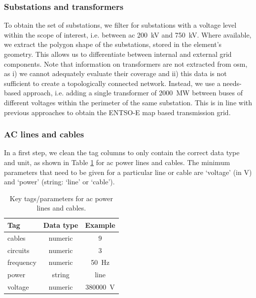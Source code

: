 \documentclass[fleqn,10pt]{wlscirep}
\let\autocite\cite
\begin{document}
\subsubsection*{Substations and transformers}
To obtain the set of substations, we filter for substations with a voltage level within the scope of interest, i.e. between \acrshort{ac} \SI{200}{\kilo\volt} and \SI{750}{\kilo\volt}. Where available, we extract the polygon shape of the substations, stored in the element's geometry. This allows us to differentiate between internal and external grid components. 
Note that information on transformers are not extracted from \acrshort{osm}, as i) we cannot adequately evaluate their coverage and ii) this data is not sufficient to create a topologically connected network. Instead, we use a needs-based approach, i.e. adding a single transformer of \SI{2000}{\mega\watt} between buses of different voltages within the perimeter of the same substation. This is in line with previous approaches to obtain the ENTSO-E map based transmission grid.\autocite{horschPyPSAEurOpenOptimisation2018}

\subsubsection*{AC lines and cables} In a first step, we clean the tag columns to only contain the correct data type and unit, as shown in Table \ref{tab:aclines_params} for \acrshort{ac} power lines and cables. The minimum parameters that need to be given for a particular line or cable are `voltage' (in \si{\volt}) and `power' (string: `line' or `cable').
% 
\begin{table}[ht]
    \centering
    \begin{tabular}{|l|c|c|}
    \hline
    \textbf{Tag} & \textbf{Data type} & \textbf{Example} \\
    \hline
    cables & numeric & 9 \\
    \hline
    circuits & numeric & 3 \\
    \hline
    frequency & numeric & \SI{50}{\hertz} \\
    \hline
    power & string & line \\
    \hline
    voltage & numeric & \SI{380000}{\volt} \\
    \hline
    \end{tabular}
    \caption{Key tags/parameters for \acrshort{ac} power lines and cables.}
    \label{tab:aclines_params} 
\end{table}
\end{document}
